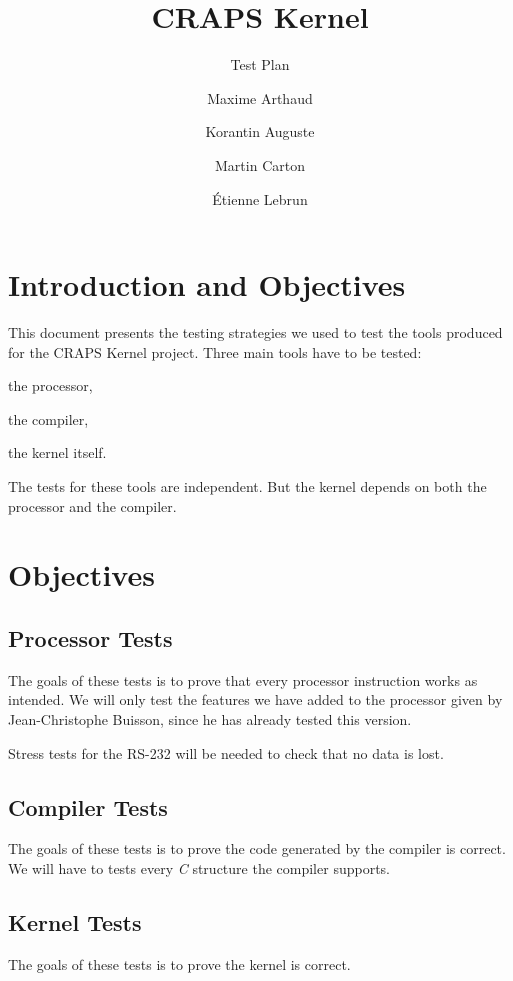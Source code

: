 \documentclass{article}
\title{CRAPS Kernel}
\subtitle{Test Plan}
\author{
       Maxime Arthaud
  \and Korantin Auguste
  \and Martin Carton
  \and Étienne Lebrun
}
\begin{document}
  
  \tableofcontents
  \newpage

  \section{Introduction and Objectives}
    This document presents the testing strategies we used to test the tools
    produced for the CRAPS Kernel project. Three main tools have to be tested:
    \begin{inparaenum}
      \item the processor,
      \item the compiler,
      \item the kernel itself.
    \end{inparaenum}

    The tests for these tools are independent. But the kernel depends on both
    the processor and the compiler.

  \section{Objectives}
    \subsection{Processor Tests}
      The goals of these tests is to prove that every processor instruction
      works as intended. We will only test the features we have added to the
      processor given by Jean-Christophe Buisson, since he has already tested
      this version.

      Stress tests for the RS-232 will be needed to check that no data is lost.

    \subsection{Compiler Tests}
      The goals of these tests is to prove the code generated by the compiler is
      correct. We will have to tests every \textit{C} structure the compiler
      supports.

    \subsection{Kernel Tests}
      The goals of these tests is to prove the kernel is correct.
\end{document}
